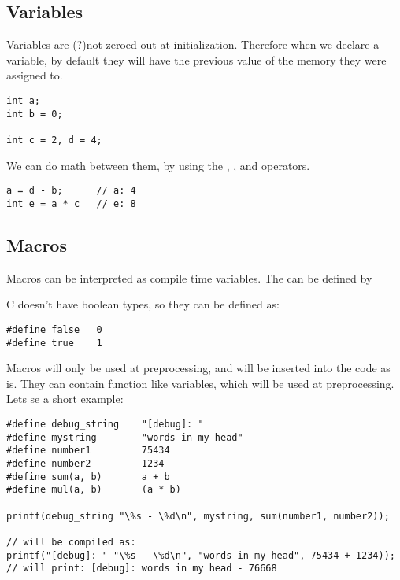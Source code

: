\subsection{Variables}
Variables are (?)not zeroed out at initialization.
Therefore when we declare a variable, by default they will have the previous value of the memory they were assigned to.

\begin{lstlisting}[style=CStyle,caption={Creating variables}]
int a;
int b = 0;

int c = 2, d = 4;

\end{lstlisting}

We can do math between them, by using the \ascode{+}, \ascode{-}, \ascode{*} and \ascode{/} operators.
\begin{lstlisting}[style=CStyle,caption={Using basic math}]
a = d - b;      // a: 4
int e = a * c   // e: 8

\end{lstlisting}


\subsection{Macros}

Macros can be interpreted as compile time variables.
The can be defined by 

C doesn't have boolean types, so they can be defined as:

\begin{lstlisting}[style=CStyle,caption={Macro example bools}]
#define false   0
#define true    1

\end{lstlisting}

Macros will only be used at preprocessing, and will be inserted into the code as is.
They can contain function like variables, which will be used at preprocessing.
Lets se a short example:

\begin{lstlisting}[style=CStyle,caption={Macro examples}]
#define debug_string    "[debug]: "
#define mystring        "words in my head"
#define number1         75434
#define number2         1234
#define sum(a, b)       a + b
#define mul(a, b)       (a * b)

printf(debug_string "\%s - \%d\n", mystring, sum(number1, number2));

// will be compiled as:
printf("[debug]: " "\%s - \%d\n", "words in my head", 75434 + 1234));
// will print: [debug]: words in my head - 76668

\end{lstlisting}

